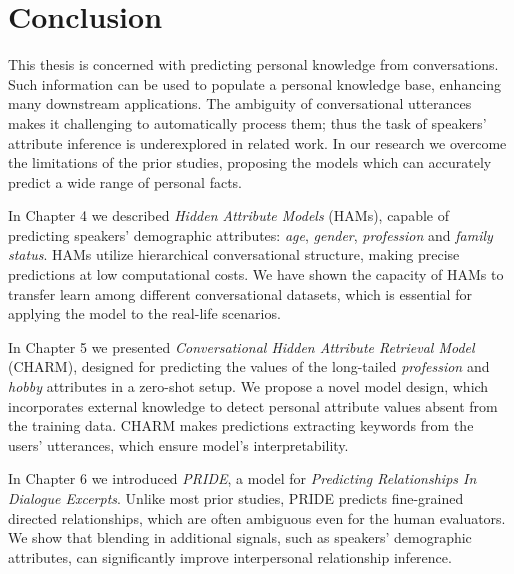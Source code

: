 \documentclass[11pt, oneside]{book}
\begin{document}
\chapter{Conclusion}

This thesis is concerned with predicting personal knowledge from conversations. Such information can be used to populate a personal knowledge base, enhancing many downstream applications. The ambiguity of conversational utterances makes it challenging to automatically process them; thus the task of speakers' attribute inference is underexplored in related work. In our research we overcome the limitations of the prior studies, proposing the models which can accurately predict a wide range of personal facts.


In Chapter 4 we described \textit{Hidden Attribute Models} (HAMs), capable of predicting speakers' demographic attributes: \textit{age}, \textit{gender}, \textit{profession} and \textit{family status}. HAMs utilize hierarchical conversational structure, making precise predictions at low computational costs. We have shown the capacity of HAMs to transfer learn among different conversational datasets, which is essential for applying the model to the real-life scenarios.

In Chapter 5 we presented \textit{Conversational Hidden Attribute Retrieval Model} (CHARM), designed for predicting the values of the long-tailed \textit{profession} and \textit{hobby} attributes in a zero-shot setup. We propose a novel model design, which incorporates external knowledge to detect personal attribute values absent from the training data. CHARM makes predictions extracting keywords from the users' utterances, which ensure model's interpretability. 

In Chapter 6 we introduced \textit{PRIDE}, a model for \textit{Predicting Relationships In Dialogue Excerpts}. Unlike most prior studies, PRIDE predicts fine-grained directed relationships, which are often ambiguous even for the human evaluators. We show that blending in additional signals, such as speakers' demographic attributes, can significantly improve interpersonal relationship inference.
\end{document}
